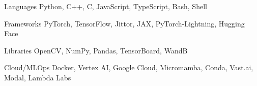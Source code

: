 

\begin{cvskills}

  \cvskill
    {Languages} %
    {Python, C++, C, JavaScript, TypeScript, Bash, Shell} %

  \cvskill
    {Frameworks} %
    {PyTorch, TensorFlow, Jittor, JAX, PyTorch-Lightning, Hugging Face} %

  \cvskill
    {Libraries} %
    {OpenCV, NumPy, Pandas, TensorBoard, WandB} %

  \cvskill
    {Cloud/MLOps} %
    {Docker, Vertex AI, Google Cloud, Micromamba, Conda, Vast.ai, Modal, Lambda Labs} %


\end{cvskills}
